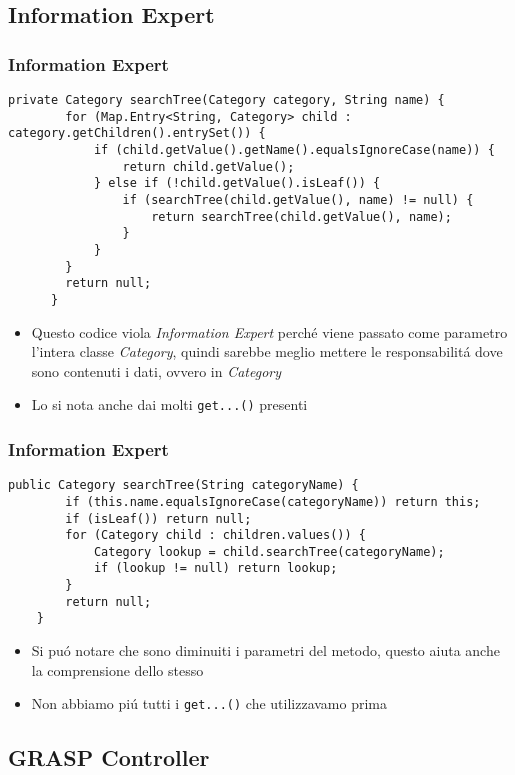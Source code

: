 \subsection{Information Expert}
    \begin{frame} [fragile]
      \frametitle{Information Expert}
        \begin{lstlisting}[autogobble, title={\texttt{CategoryController.java}}]
            private Category searchTree(Category category, String name) {
        for (Map.Entry<String, Category> child : category.getChildren().entrySet()) {
            if (child.getValue().getName().equalsIgnoreCase(name)) {
                return child.getValue();
            } else if (!child.getValue().isLeaf()) {
                if (searchTree(child.getValue(), name) != null) {
                    return searchTree(child.getValue(), name);
                }
            }
        }
        return null;
      }
        \end{lstlisting}
      \begin{itemize}
          \item Questo codice viola \emph{Information Expert} perché
          viene passato come parametro l'intera classe \emph{Category}, quindi sarebbe meglio
          mettere le responsabilitá dove sono contenuti i dati, ovvero in \emph{Category}
          \item Lo si nota anche dai molti \texttt{get...()} presenti
      \end{itemize}
    \end{frame}

\begin{frame} [fragile]
    \frametitle{Information Expert}
    \begin{lstlisting}[autogobble, title={\texttt{Category.java}}]
        public Category searchTree(String categoryName) {
        if (this.name.equalsIgnoreCase(categoryName)) return this;
        if (isLeaf()) return null;
        for (Category child : children.values()) {
            Category lookup = child.searchTree(categoryName);
            if (lookup != null) return lookup;
        }
        return null;
    }
    \end{lstlisting}
    \begin{itemize}
        \item Si puó notare che sono diminuiti i parametri del metodo, questo aiuta anche la comprensione dello stesso
        \item Non abbiamo piú tutti i \texttt{get...()} che utilizzavamo prima
    \end{itemize}
\end{frame}

\subsection{GRASP Controller}
